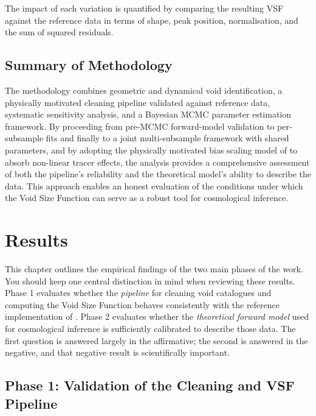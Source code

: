 \documentclass[12pt]{report}
\begin{document}
The impact of each variation is quantified by comparing the resulting VSF against the reference data in terms of shape, peak position, normalisation, and the sum of squared residuals.


\section{Summary of Methodology}

The methodology combines geometric and dynamical void identification, a physically motivated cleaning pipeline validated against reference data, systematic sensitivity analysis, and a Bayesian MCMC parameter estimation framework. By proceeding from pre-MCMC forward-model validation to per-subsample fits and finally to a joint multi-subsample framework with shared parameters, and by adopting the physically motivated bias scaling model of \citet{Contarini2019} to absorb non-linear tracer effects, the analysis provides a comprehensive assessment of both the pipeline's reliability and the theoretical model's ability to describe the data. This approach enables an honest evaluation of the conditions under which the Void Size Function can serve as a robust tool for cosmological inference.



\chapter{Results}
\label{chap:results}

This chapter outlines the empirical findings of the two main phases of the work. You should keep one central distinction in mind when reviewing these results. Phase 1 evaluates whether the \emph{pipeline} for cleaning void catalogues and computing the Void Size Function behaves consistently with the reference implementation of \citet{Sartori2025}. Phase 2 evaluates whether the \emph{theoretical forward model} used for cosmological inference is sufficiently calibrated to describe those data. The first question is answered largely in the affirmative; the second is answered in the negative, and that negative result is scientifically important.

\section{Phase 1: Validation of the Cleaning and VSF Pipeline}
\label{sec:results_phase1}
\end{document}
